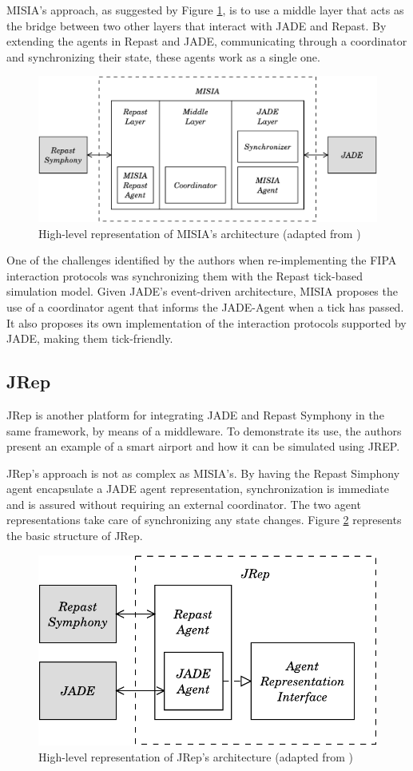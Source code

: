 MISIA's approach, as suggested by Figure \ref{fig:misia}, is to use a middle layer that acts as the bridge between two other layers that interact with JADE and Repast. By extending the agents in Repast and JADE, communicating through a coordinator and synchronizing their state, these agents work as a single one.

\begin{figure}[h]
	\centering
	\includegraphics[width=0.75\linewidth]{figures/MISIA.pdf}
	\caption[MISIA's architecture]{High-level representation of MISIA's architecture (adapted from \cite{garcia2011misia})}
	\label{fig:misia}
\end{figure}

One of the challenges identified by the authors when re-implementing the FIPA interaction protocols was synchronizing them with the Repast tick-based simulation model. Given JADE's event-driven architecture, MISIA proposes the use of a coordinator agent that informs the JADE-Agent when a tick has passed. It also proposes its own implementation of the interaction protocols supported by JADE, making them tick-friendly.

\subsection{JRep}
JRep is another platform for integrating JADE and Repast Symphony in the same framework, by means of a middleware. To demonstrate its use, the authors present an example of a smart airport and how it can be simulated using JREP.

JRep's approach is not as complex as MISIA's.
By having the Repast Simphony agent encapsulate a JADE agent representation, synchronization is immediate and is assured without requiring an external coordinator.
The two agent representations take care of synchronizing any state changes.
Figure \ref{fig:jrep} represents the basic structure of JRep.

\begin{figure}[h]
	\centering
	\includegraphics[width=0.5\linewidth]{figures/jrep.pdf}
	\caption[JRep's architecture]{High-level representation of JRep's architecture (adapted from \cite{gormer2011jrep})}
	\label{fig:jrep}
\end{figure}

